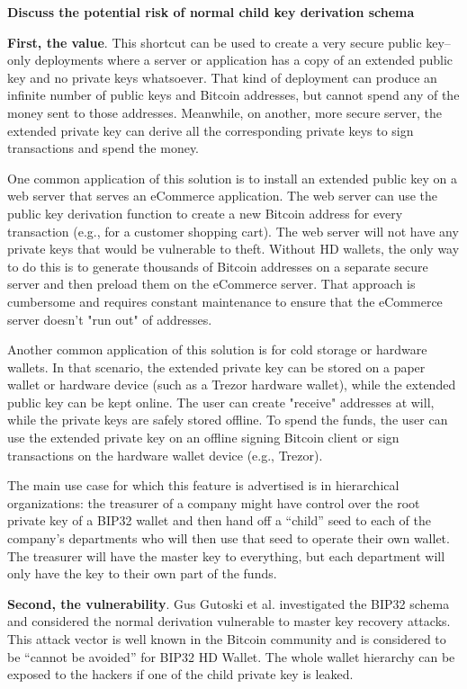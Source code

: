 \bigskip
{\textbf{Discuss the potential risk of normal child key derivation schema}}
\label{bip32vul}
\begin{adjustwidth}{1cm}{}
    \bigskip
    {\textbf{First, the value}}. This shortcut can be used to create a very secure public key–only deployments where a server or application has a copy of an extended public key and no private keys whatsoever. That kind of deployment can produce an infinite number of public keys and Bitcoin addresses, but cannot spend any of the money sent to those addresses. Meanwhile, on another, more secure server, the extended private key can derive all the corresponding private keys to sign transactions and spend the money.

    One common application of this solution is to install an extended public key on a web server that serves an eCommerce application. The web server can use the public key derivation function to create a new Bitcoin address for every transaction (e.g., for a customer shopping cart). The web server will not have any private keys that would be vulnerable to theft. Without HD wallets, the only way to do this is to generate thousands of Bitcoin addresses on a separate secure server and then preload them on the eCommerce server. That approach is cumbersome and requires constant maintenance to ensure that the eCommerce server doesn’t "run out" of addresses.

    Another common application of this solution is for cold storage or hardware wallets. In that scenario, the extended private key can be stored on a paper wallet or hardware device (such as a Trezor hardware wallet), while the extended public key can be kept online. The user can create "receive" addresses at will, while the private keys are safely stored offline. To spend the funds, the user can use the extended private key on an offline signing Bitcoin client or sign transactions on the hardware wallet device (e.g., Trezor).

    The main use case for which this feature is advertised is in hierarchical organizations: the treasurer of a company might have control over the root private key of a BIP32 wallet and then hand off a “child” seed to each of the company’s departments who will then use that seed to operate their own wallet. The treasurer will have the master key to everything, but each department will only have the key to their own part of the funds.

    \bigskip
    {\textbf{Second, the vulnerability}}. Gus Gutoski et al.\cite{DBLP:conf/fc/GutoskiS15} investigated the BIP32 schema and considered the normal derivation vulnerable to master key recovery attacks. This attack vector is well known in the Bitcoin community and is considered to be “cannot be avoided” for BIP32 HD Wallet. The whole wallet hierarchy can be exposed to the hackers if one of the child private key is leaked.


\end{adjustwidth}
